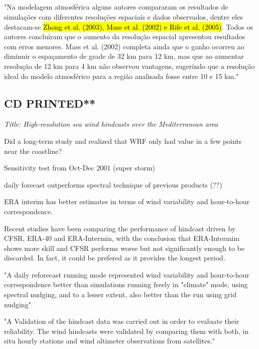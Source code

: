 \documentclass[12pt,a4paper]{article}
\begin{document}
\subsection{\cite{Lewis2017}}


"Na modelagem atmosférica alguns autores compararam os resultados de simulações com diferentes resoluções espaciais e dados observados, dentre eles destacam-se \hl{Zhong et al. (2003), Mass et al. (2002) e Rife et al. (2005)}. Todos os autores concluíram que o aumento da resolução espacial apresentou resultados com erros menores. Mass et al. (2002) completa ainda que o ganho ocorreu ao diminuir o espaçamento de grade de 32 km para 12 km, mas que ao aumentar resolução de 12 km para 4 km não observou vantagens, sugerindo que a resolução ideal do modelo atmosférico para a região analisada fosse entre 10 e 15 km."


\subsection{\cite{Menendez2014a} CD PRINTED**}

\textit{Title: High-resolution sea wind hindcasts over the Mediterranean area}

Did a long-term study and realized that WRF only had value in a few points near the coastline?

Sensitivity test from Oct-Dec 2001 (super storm)

daily forecast outperforms spectral technique of previous products (??)

ERA interim has better estimates in terms of wind variability and hour-to-hour correspondence. 

Recent studies have been comparing the performance of hindcast driven by \gls{CFSR}, ERA-40 and ERA-Intermin, with the conclusion that ERA-Intermim shows more skill and \gls{CFSR} performs worse but not significantly enough to be discarded. In fact, it could be prefered as it provides the longest period. 

"A daily reforecast running mode represented wind variability and hour-to-hour correspondence better than simulations running freely in "climate" mode, using spectral nudging, and to a lesser extent, also better than the run using grid nudging"

"A Validation of the hindcast data was carried out in order to evaluate their reliability. The wind hindcasts were validated by comparing them with both, in situ hourly stations and wind altimeter observations from satellites."
\end{document}
